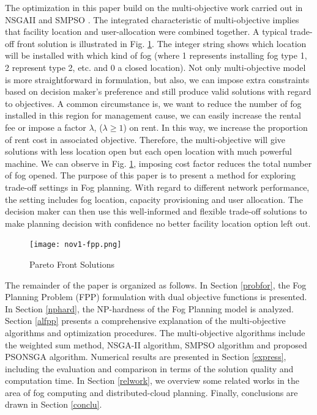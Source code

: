 \documentclass[10pt,journal,compsoc]{IEEEtran}
\begin{document}
The optimization in this paper build on the multi-objective work carried out in NSGAII\cite{Deb:2002:FEM:2221359.2221582} and SMPSO \cite{smpso}. The integrated characteristic of multi-objective implies that facility location and user-allocation were combined together. A typical trade-off front solution is illustrated in Fig. \ref{tradeofffront}. The integer string shows which location will be installed with which kind of fog (where 1 represents installing fog type 1, 2 represent type 2, etc. and 0 a closed location). Not only multi-objective model is more straightforward in formulation, but also, we can impose extra constraints based on decision maker's preference and still produce valid solutions with regard to objectives. A common circumstance is, we want to reduce the number of fog installed in this region for management cause, we can easily increase the rental fee or impose a factor $\lambda$, ($ \lambda \geq 1$) on rent. In this way, we increase the proportion of rent cost in associated objective. Therefore, the multi-objective will give solutions with less location open but each open location with much powerful machine. We can observe in Fig. \ref{tradeofffront}, imposing cost factor reduces the total number of fog opened. 
The purpose of this paper is to present a method for exploring trade-off settings in Fog planning. With regard to different network performance, the setting includes fog location, capacity provisioning and user allocation. The decision maker can then use this well-informed and flexible trade-off solutions to make planning decision with confidence no better facility location option left out.
\begin{figure}
\centerline{\texttt{[image: nov1-fpp.png]}}
\caption{Pareto Front Solutions} 
\label{tradeofffront}
\end{figure}
\fi

The remainder of the paper is organized as follows. In Section \ref{probfor}, the Fog Planning Problem (FPP) formulation with dual objective functions is presented. In Section \ref{nphard}, the NP-hardness of the Fog Planning model is analyzed. Section \ref{alfpp} presents a comprehensive explanation of the multi-objective algorithms and optimization procedures. The multi-objective algorithms include the weighted sum method, NSGA-II algorithm, SMPSO algorithm and proposed PSONSGA algorithm. Numerical results are presented in Section \ref{express}, including the evaluation and comparison in terms of the solution quality and computation time. In Section \ref{relwork}, we overview some related works in the area of fog computing and distributed-cloud planning. Finally, conclusions are drawn in Section \ref{conclu}.
\end{document}
